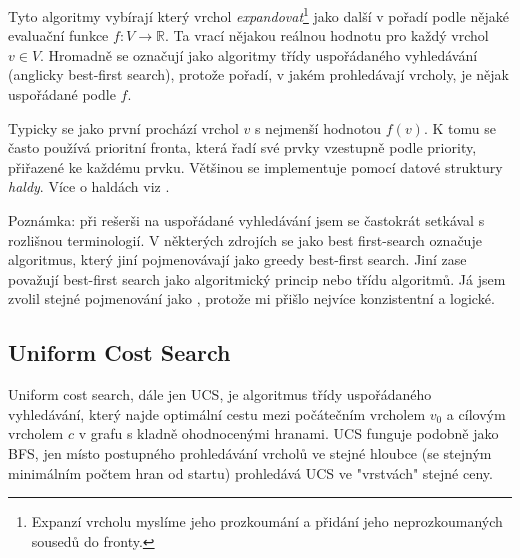 \documentclass[12pt]{report}			%
\begin{document}
			
			Tyto algoritmy vybírají který vrchol \emph{expandovat}\footnote{Expanzí vrcholu myslíme jeho prozkoumání a přidání jeho neprozkoumaných sousedů do fronty.} jako další v pořadí podle nějaké evaluační funkce $f : V \rightarrow \mathbb{R}$. Ta vrací nějakou reálnou hodnotu pro každý vrchol $v \in V$. 
			Hromadně se označují jako algoritmy třídy uspořádaného vyhledávání (anglicky best-first search), protože pořadí, v jakém prohledávají vrcholy, je nějak uspořádané podle $f$.

			Typicky se jako první prochází vrchol $v$ s nejmenší hodnotou $f(v)$. K tomu se často používá prioritní fronta, která řadí své prvky vzestupně podle priority, přiřazené ke každému prvku. Většinou se implementuje pomocí datové struktury \emph{haldy}. Více o haldách viz \cite{pruvodce}.			
			
			Poznámka: při rešerši na uspořádané vyhledávání jsem se častokrát setkával s rozlišnou terminologií. V některých zdrojích \cite{carlos} se jako best first-search označuje algoritmus, který jiní \cite{patel_intro} pojmenovávají jako greedy best-first search. Jiní \cite{uhlik,wiki_best_first,felner} zase považují best-first search jako algoritmický princip nebo třídu algoritmů.
			 Já jsem zvolil stejné pojmenování jako \cite{patel_intro, uhlik, felner}, protože mi přišlo nejvíce konzistentní a logické.
			
			
			

			\subsection{Uniform Cost Search}
			Uniform cost search, dále jen UCS, je algoritmus třídy uspořádaného vyhledávání, který najde optimální %
			cestu mezi počátečním vrcholem $v_0$ a cílovým vrcholem $c$ v grafu s kladně ohodnocenými hranami. 
			UCS funguje podobně jako BFS, jen místo postupného prohledávání vrcholů ve stejné hloubce (se stejným minimálním počtem hran od startu) prohledává UCS ve "vrstvách" stejné ceny.
			
\end{document}
